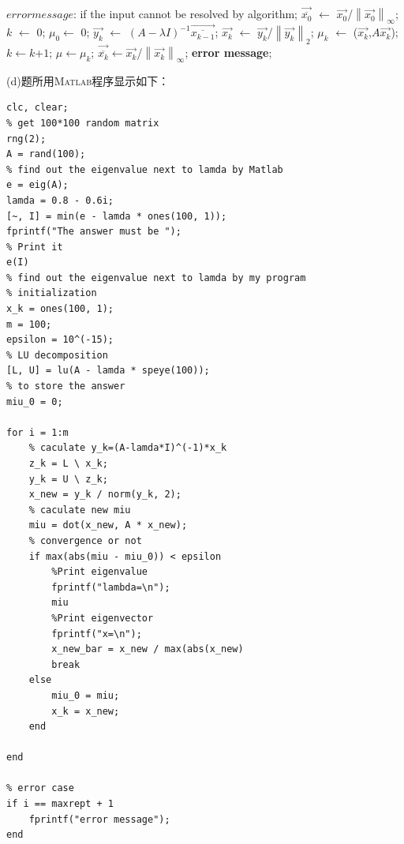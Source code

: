 \documentclass[12pt,a4paper,UTF8]{ctexart}
\begin{document}
\begin{enumerate}
\begin{algorithm}[H]
\begin{algorithmic}[1]
                  $error message$: if the input cannot be resolved by algorithm;
                  \State $\overrightarrow{\overline{x_{0}}}$ $\leftarrow$ ${\overrightarrow{x_{0}}}$/${\left\lVert \overrightarrow{x_{0}}\right\rVert_{\infty} }$;
                  \State $k$ $\leftarrow$ $0$;
                  \State$\mu_{0}$$\leftarrow$ $0$;
                              \State$\overrightarrow{y_{k}}$ $\leftarrow$ $(A-\lambda I)^{-1}$$\overrightarrow{\overline{x_{k-1}}}$;
                          \State$\overrightarrow{x_{k}}$ $\leftarrow$ $\overrightarrow{y_{k}}$/${\left\lVert \overrightarrow{y_{k}}\right\rVert_{2} }$;
                          \State$\mu_{k}$ $\leftarrow$ ($\overrightarrow{x_{k}}$,$A\overrightarrow{x_{k}}$);
                          \State$k$$\leftarrow$$k$+$1$;
                          \State$\mu$$\leftarrow$$\mu_{k}$;
                          \State$\overrightarrow{\overline{x_{k}} }$$\leftarrow$$\overrightarrow{x_{k}}$/${\left\lVert \overrightarrow{x_{k}}\right\rVert_{\infty} }$;
                  \State{}
                  \EndIf
                  \EndFor
                  \State \textbf{error message};
              \end{algorithmic}
          \end{algorithm}
          (d)题所用\textsc{Matlab}程序显示如下：
          \begin{lstlisting}[frame=single]
clc, clear;
% get 100*100 random matrix
rng(2);
A = rand(100);
% find out the eigenvalue next to lamda by Matlab
e = eig(A);
lamda = 0.8 - 0.6i;
[~, I] = min(e - lamda * ones(100, 1));
fprintf("The answer must be ");
% Print it
e(I)
% find out the eigenvalue next to lamda by my program
% initialization
x_k = ones(100, 1);
m = 100;
epsilon = 10^(-15);
% LU decomposition
[L, U] = lu(A - lamda * speye(100));
% to store the answer
miu_0 = 0;

for i = 1:m
    % caculate y_k=(A-lamda*I)^(-1)*x_k
    z_k = L \ x_k;
    y_k = U \ z_k;
    x_new = y_k / norm(y_k, 2);
    % caculate new miu
    miu = dot(x_new, A * x_new);
    % convergence or not
    if max(abs(miu - miu_0)) < epsilon
        %Print eigenvalue
        fprintf("lambda=\n");
        miu
        %Print eigenvector
        fprintf("x=\n");
        x_new_bar = x_new / max(abs(x_new)
        break
    else
        miu_0 = miu;
        x_k = x_new;
    end

end

% error case
if i == maxrept + 1
    fprintf("error message");
end
          \end{lstlisting}
\end{enumerate}
\end{document}
